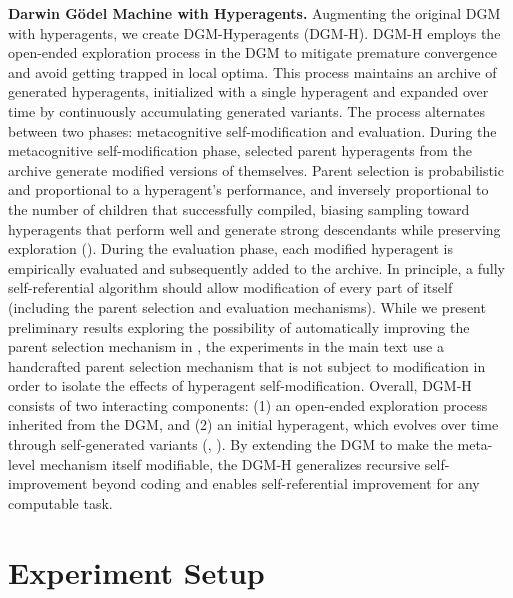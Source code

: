 \documentclass[]{fairmeta}
\begin{document}
\textbf{Darwin G\"odel Machine with Hyperagents.}
Augmenting the original DGM \citep{zhang2025darwin} with hyperagents, we create DGM-Hyperagents (DGM-H). DGM-H employs the open-ended exploration process in the DGM to mitigate premature convergence and avoid getting trapped in local optima. This process maintains an archive of generated hyperagents, initialized with a single hyperagent and expanded over time by continuously accumulating generated variants. The process alternates between two phases: metacognitive self-modification and evaluation. During the metacognitive self-modification phase, selected parent hyperagents from the archive generate modified versions of themselves. Parent selection is probabilistic and proportional to a hyperagent's performance, and inversely proportional to the number of children that successfully compiled, biasing sampling toward hyperagents that perform well and generate strong descendants while preserving exploration (). During the evaluation phase, each modified hyperagent is empirically evaluated and subsequently added to the archive. In principle, a fully self-referential algorithm should allow modification of every part of itself (including the parent selection and evaluation mechanisms). While we present preliminary results exploring the possibility of automatically improving the parent selection mechanism in , the experiments in the main text use a handcrafted parent selection mechanism that is not subject to modification in order to isolate the effects of hyperagent self-modification. Overall, DGM-H consists of two interacting components: (1) an open-ended exploration process inherited from the DGM, and (2) an initial hyperagent, which evolves over time through self-generated variants (, ). By extending the DGM to make the meta-level mechanism itself modifiable, the DGM-H generalizes recursive self-improvement beyond coding and enables self-referential improvement for any computable task.

\section{Experiment Setup}
\label{sec:exp-setup}
\end{document}
